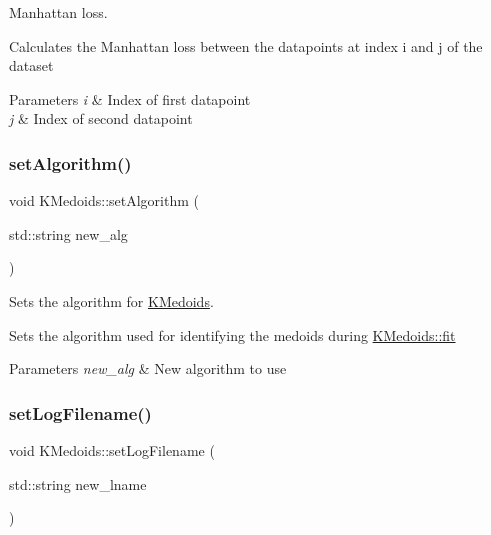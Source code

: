 Manhattan loss. 

Calculates the Manhattan loss between the datapoints at index i and j of the dataset


\begin{DoxyParams}{Parameters}
{\em i} & Index of first datapoint \\
\hline
{\em j} & Index of second datapoint \\
\hline
\end{DoxyParams}
\mbox{\label{classKMedoids_a1a6dbc45f5d83bded48bf86cbc2690ad}} 
\subsubsection{\texorpdfstring{set\+Algorithm()}{setAlgorithm()}}
{\footnotesize\ttfamily void K\+Medoids\+::set\+Algorithm (\begin{DoxyParamCaption}\item[{std\+::string}]{new\+\_\+alg }\end{DoxyParamCaption})}



Sets the algorithm for \hyperlink{classKMedoids}{K\+Medoids}. 

Sets the algorithm used for identifying the medoids during \hyperlink{classKMedoids_ae241800e72a6b4a677333ffbf06e1798}{K\+Medoids\+::fit}


\begin{DoxyParams}{Parameters}
{\em new\+\_\+alg} & New algorithm to use \\
\hline
\end{DoxyParams}
\mbox{\label{classKMedoids_a45f89770245bff638e25bcd39ab52013}} 
\subsubsection{\texorpdfstring{set\+Log\+Filename()}{setLogFilename()}}
{\footnotesize\ttfamily void K\+Medoids\+::set\+Log\+Filename (\begin{DoxyParamCaption}\item[{std\+::string}]{new\+\_\+lname }\end{DoxyParamCaption})}



